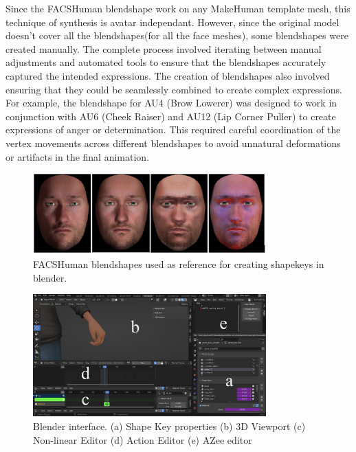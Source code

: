 \documentclass[../../main.tex]{subfiles}
\begin{document}
Since the FACSHuman blendshape work on any MakeHuman template mesh, this technique of synthesis is avatar independant. However, since the original model doesn't cover all the blendshapes(for all the face meshes), some blendshapes were created manually. The complete process involved iterating between manual adjustments and automated tools to ensure that the blendshapes accurately captured the intended expressions. The creation of blendshapes also involved ensuring that they could be seamlessly combined to create complex expressions. For example, the blendshape for AU4 (Brow Lowerer) was designed to work in conjunction with AU6 (Cheek Raiser) and AU12 (Lip Corner Puller) to create expressions of anger or determination. This required careful coordination of the vertex movements across different blendshapes to avoid unnatural deformations or artifacts in the final animation.

\begin{figure}
    \centering
    \includegraphics[width=0.8\textwidth]{chapters/facial_expressions/images/facshuman_blendshapes.png}
    \caption{FACSHuman blendshapes used as reference for creating shapekeys in blender.}
    \label{fig:facshuman_blendshapes}
\end{figure}

\begin{figure}
    \centering
    \includegraphics[width=0.8\textwidth]{chapters/facial_expressions/images/shape_keys.png}
    \caption{Blender interface. (a) Shape Key properties (b) 3D Viewport (c) Non-linear Editor (d) Action Editor (e) AZee editor}
    \label{fig:shape_keys}
\end{figure}
\end{document}
